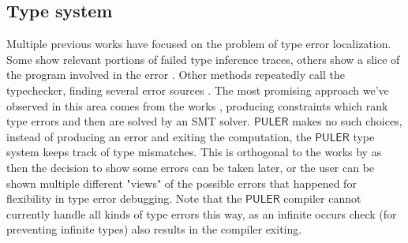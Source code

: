 \documentclass{article} %
\newcommand{\PULER}{\mathsf{PULER}}
\begin{document}
\subsection{Type system}\label{type-system}
Multiple previous works have focused on the problem of type error localization.
Some show relevant portions of failed type inference traces\cite{DUGGAN199637, type_errors_src}, others show a slice of the program involved in the error \cite{Gast2005, slicing_type_errors}.
Other methods repeatedly call the typechecker, finding several error sources \cite{constraint_errors}.
The most promising approach we've observed in this area comes from the works \citet{min_type_error, type_error_diagnose}, producing constraints which rank type errors and then are solved by an SMT solver.
$\PULER$ makes no such choices, instead of producing an error and exiting the computation, the $\PULER$ type system keeps track of type mismatches.
This is orthogonal to the works by \citet{min_type_error} as then the decision to show some errors can be taken later, or the user can be shown multiple different "views" of the possible errors that happened for flexibility in type error debugging.
Note that the $\PULER$ compiler cannot currently handle all kinds of type errors this way, as an infinite occurs check (for preventing infinite types) also results in the compiler exiting.
\end{document}
